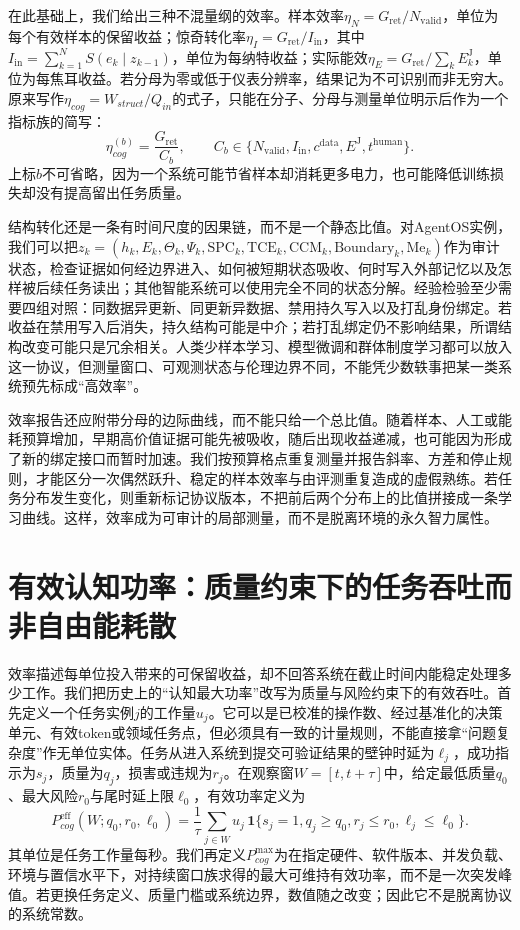 在此基础上，我们给出三种不混量纲的效率。样本效率$\eta_N=G_{\mathrm{ret}}/N_{\mathrm{valid}}$，单位为每个有效样本的保留收益；惊奇转化率$\eta_I=G_{\mathrm{ret}}/I_{\mathrm{in}}$，其中$I_{\mathrm{in}}=\sum_{k=1}^{N}S(e_k\mid z_{k-1})$，单位为每纳特收益；实际能效$\eta_E=G_{\mathrm{ret}}/\sum_k E_k^{\mathrm{J}}$，单位为每焦耳收益。若分母为零或低于仪表分辨率，结果记为不可识别而非无穷大。原来写作$\eta_{cog}=W_{struct}/Q_{in}$的式子，只能在分子、分母与测量单位明示后作为一个指标族的简写：
\begin{equation}
\eta_{cog}^{(b)}=\frac{G_{\mathrm{ret}}}{C_b},\qquad C_b\in\{N_{\mathrm{valid}},I_{\mathrm{in}},c^{\mathrm{data}},E^{\mathrm{J}},t^{\mathrm{human}}\}.
\end{equation}
上标$b$不可省略，因为一个系统可能节省样本却消耗更多电力，也可能降低训练损失却没有提高留出任务质量。

结构转化还是一条有时间尺度的因果链，而不是一个静态比值。对AgentOS实例，我们可以把$z_k=(h_k,E_k,\Theta_k,\Psi_k,\mathrm{SPC}_k,\mathrm{TCE}_k,\mathrm{CCM}_k,\mathrm{Boundary}_k,\mathrm{Me}_k)$作为审计状态，检查证据如何经边界进入、如何被短期状态吸收、何时写入外部记忆以及怎样被后续任务读出；其他智能系统可以使用完全不同的状态分解。经验检验至少需要四组对照：同数据异更新、同更新异数据、禁用持久写入以及打乱身份绑定。若收益在禁用写入后消失，持久结构可能是中介；若打乱绑定仍不影响结果，所谓结构改变可能只是冗余相关。人类少样本学习、模型微调和群体制度学习都可以放入这一协议，但测量窗口、可观测状态与伦理边界不同，不能凭少数轶事把某一类系统预先标成“高效率”。

效率报告还应附带分母的边际曲线，而不能只给一个总比值。随着样本、人工或能耗预算增加，早期高价值证据可能先被吸收，随后出现收益递减，也可能因为形成了新的绑定接口而暂时加速。我们按预算格点重复测量并报告斜率、方差和停止规则，才能区分一次偶然跃升、稳定的样本效率与由评测重复造成的虚假熟练。若任务分布发生变化，则重新标记协议版本，不把前后两个分布上的比值拼接成一条学习曲线。这样，效率成为可审计的局部测量，而不是脱离环境的永久智力属性。

\section{有效认知功率：质量约束下的任务吞吐而非自由能耗散}
\label{sec:cognitive_power}

效率描述每单位投入带来的可保留收益，却不回答系统在截止时间内能稳定处理多少工作。我们把历史上的“认知最大功率”改写为质量与风险约束下的有效吞吐。首先定义一个任务实例$j$的工作量$u_j$。它可以是已校准的操作数、经过基准化的决策单元、有效token或领域任务点，但必须具有一致的计量规则，不能直接拿“问题复杂度”作无单位实体。任务从进入系统到提交可验证结果的壁钟时延为$\ell_j$，成功指示为$s_j$，质量为$q_j$，损害或违规为$r_j$。在观察窗$W=[t,t+\tau]$中，给定最低质量$q_0$、最大风险$r_0$与尾时延上限$\ell_0$，有效功率定义为
\begin{equation}
P_{cog}^{\mathrm{eff}}(W;q_0,r_0,\ell_0)=\frac{1}{\tau}\sum_{j\in W}u_j\,\mathbf{1}\{s_j=1,q_j\ge q_0,r_j\le r_0,\ell_j\le\ell_0\}.
\end{equation}
其单位是任务工作量每秒。我们再定义$P_{cog}^{\max}$为在指定硬件、软件版本、并发负载、环境与置信水平下，对持续窗口族求得的最大可维持有效功率，而不是一次突发峰值。若更换任务定义、质量门槛或系统边界，数值随之改变；因此它不是脱离协议的系统常数。

